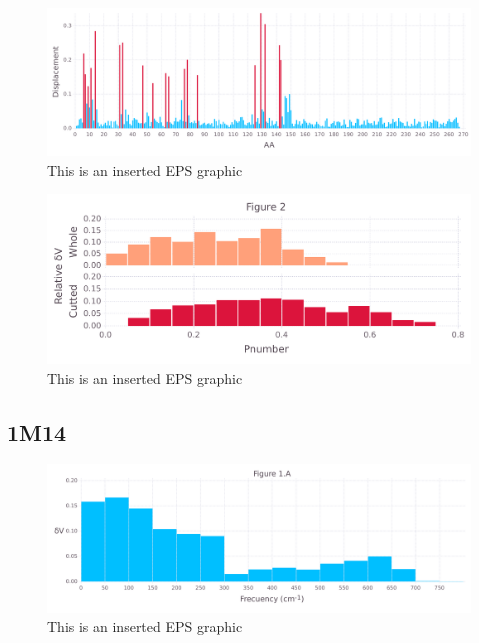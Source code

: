 \documentclass[10pt,letterpaper]{article}
\begin{document}
\begin{figure}[ht]
\begin{center}
\includegraphics[scale=0.5]{1xkk/5figure.pdf}
\caption{This is an inserted EPS graphic}
\label{fig13}
\end{center}
\end{figure}

\begin{figure}[ht]
\begin{center}
\includegraphics[scale=0.5]{1xkk/3both_figure.pdf}
\caption{This is an inserted EPS graphic}
\label{fig13}
\end{center}
\end{figure}

\FloatBarrier
\newpage

\subsection{1M14}

\begin{figure}[ht]
\begin{center}
\includegraphics[scale=0.5]{1m14/1afigure.pdf}
\caption{This is an inserted EPS graphic}
\label{fig1}
\end{center}
\end{figure}
\end{document}
